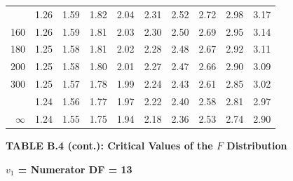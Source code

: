 \documentclass[10pt]{article}
\begin{document}
\begin{longtable}{@{}r!{\vrule width 0.8pt\hspace{0.55em}}rrrrrrrrr@{}}
 & 1.26 & 1.59 & 1.82 & 2.04 & 2.31 & 2.52 & 2.72 & 2.98 & 3.17 \\
160 & 1.26 & 1.59 & 1.81 & 2.03 & 2.30 & 2.50 & 2.69 & 2.95 & 3.14 \\
180 & 1.25 & 1.58 & 1.81 & 2.02 & 2.28 & 2.48 & 2.67 & 2.92 & 3.11 \\
200 & 1.25 & 1.58 & 1.80 & 2.01 & 2.27 & 2.47 & 2.66 & 2.90 & 3.09 \\
300 & 1.25 & 1.57 & 1.78 & 1.99 & 2.24 & 2.43 & 2.61 & 2.85 & 3.02 \\
 & 1.24 & 1.56 & 1.77 & 1.97 & 2.22 & 2.40 & 2.58 & 2.81 & 2.97 \\
$\infty$ & 1.24 & 1.55 & 1.75 & 1.94 & 2.18 & 2.36 & 2.53 & 2.74 & 2.90 \\
\end{longtable}
\newpage
\thispagestyle{empty}
\begin{center}
{\large\bfseries TABLE B.4 (cont.): Critical Values of the $F$ Distribution\par}
\end{center}
{\large\bfseries $v_1$ = Numerator DF = 13\par}
\vspace{0.5em}
\small
\end{document}

